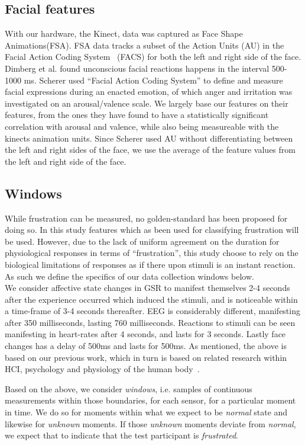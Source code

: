 \subsection{Facial features}
With our hardware, the Kinect, data was captured as Face Shape Animations(FSA)\cite{faceshapes}.
FSA data tracks a subset of the Action Units (AU) in the Facial Action Coding System~\cite{facs_kinect_muscles} (FACS) for both the left and right side of the face.
Dimberg et al. \cite{face_onset} found unconscious facial reactions happens in the interval 500-1000 ms.
Scherer used ``Facial Action Coding System'' to define and measure facial expressions during an enacted emotion, of which anger and irritation was investigated on an arousal/valence scale.\cite{scherer_kinect}
We largely base our features on their features, from the ones they have found to have a statistically significant correlation with arousal and valence, while also being measureable with the kinects animation units.
Since Scherer used AU without differentiating between the left and right sides of the face, we use the average of the feature values from the left and right side of the face.

\subsection{Windows}
While frustration can be measured, no golden-standard has been proposed for doing so. 
In this study features which as been used for classifying frustration will be used.
However, due to the lack of uniform agreement on the duration for physiological responses in terms of ``frustration'', this study choose to rely on the biological limitations of responses as if there upon stimuli is an instant reaction.
As such we define the specifics of our data collection windows below.\\
We consider affective state changes in GSR to manifest themselves 2-4 seconds after the experience occurred which
induced the stimuli, and is noticeable within a time-frame of 3-4 seconds thereafter. EEG is considerably different,
manifesting after 350 milliseconds, lasting 760 milliseconds. Reactions to stimuli can be seen manifesting in heart-rates
after 4 seconds, and lasts for 3 seconds. Lastly face changes has a delay of 500ms and lasts for 500ms. As mentioned,
the above is based on our previous work, which in turn is based on related research within HCI, psychology and
physiology of the human body~\cite{9th_semester_project}.

Based on the above, we consider \textit{windows}, i.e. samples of continuous measurements within those boundaries, for
each sensor, for a particular moment in time. We do so for moments within what we expect to be \textit{normal} state and
likewise for \textit{unknown} moments. If those \textit{unknown} moments deviate from \textit{normal}, we expect that to
indicate that the test participant is \textit{frustrated}.
